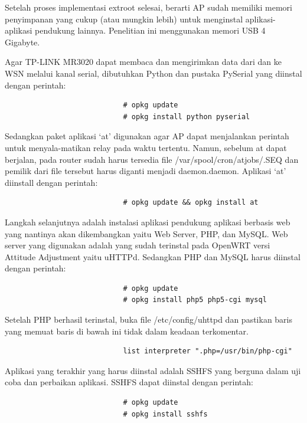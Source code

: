 \begin{enumerate}
					Setelah proses implementasi extroot selesai, berarti AP sudah memiliki memori penyimpanan yang cukup (atau mungkin lebih) untuk menginstal aplikasi-aplikasi pendukung lainnya. Penelitian ini menggunakan memori USB 4 Gigabyte.

					Agar TP-LINK MR3020 dapat membaca dan mengirimkan data dari dan ke WSN melalui kanal serial, dibutuhkan Python dan pustaka PySerial yang diinstal dengan perintah:
					\begingroup
					    \fontsize{10pt}{12pt}\selectfont
					    \begin{verbatim}
							# opkg update
							# opkg install python pyserial
					    \end{verbatim}  
					\endgroup

					Sedangkan paket aplikasi `at' digunakan agar AP dapat menjalankan perintah untuk menyala-matikan relay pada waktu tertentu. Namun, sebelum at dapat berjalan, pada router sudah harus tersedia file /var/spool/cron/atjobs/.SEQ dan pemilik dari file tersebut harus diganti menjadi daemon.daemon. Aplikasi `at' diinstall dengan perintah:
					\begingroup
					    \fontsize{10pt}{12pt}\selectfont
					    \begin{verbatim}
							# opkg update && opkg install at
					    \end{verbatim}  
					\endgroup
					
					Langkah selanjutnya adalah instalasi aplikasi pendukung aplikasi berbasis web yang nantinya akan dikembangkan yaitu Web Server, PHP, dan MySQL. Web server yang digunakan adalah yang sudah terinstal pada OpenWRT versi Attitude Adjustment yaitu uHTTPd. Sedangkan PHP dan MySQL harus diinstal dengan perintah:
					\begingroup
					    \fontsize{10pt}{12pt}\selectfont
					    \begin{verbatim}
							# opkg update
							# opkg install php5 php5-cgi mysql
					    \end{verbatim}  
					\endgroup

					Setelah PHP berhasil terinstal, buka file /etc/config/uhttpd dan pastikan baris yang memuat baris di bawah ini tidak dalam keadaan terkomentar.
					\begingroup
					    \fontsize{10pt}{12pt}\selectfont
					    \centering
					    \begin{verbatim}
							list interpreter ".php=/usr/bin/php-cgi"
					    \end{verbatim}  
					\endgroup					

					Aplikasi yang terakhir yang harus diinstal adalah SSHFS yang berguna dalam uji coba dan perbaikan aplikasi. SSHFS dapat diinstal dengan perintah:
					\begingroup
					    \fontsize{10pt}{12pt}\selectfont
					    \begin{verbatim}
							# opkg update
							# opkg install sshfs
					    \end{verbatim}  
					\endgroup


\end{enumerate}
